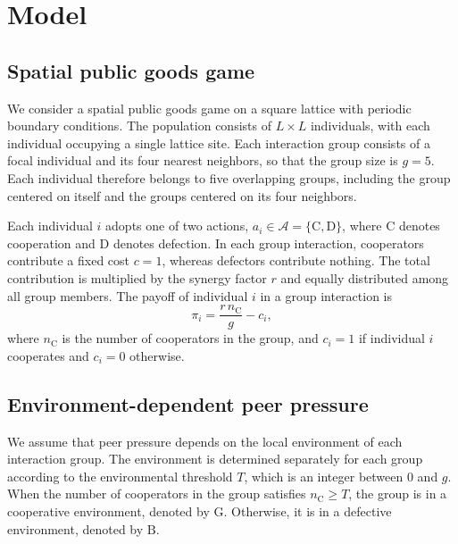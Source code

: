 \documentclass[%
  aip,cha,
  amsmath,amssymb,
  reprint,
  floatfix,
  article-title,
]{revtex4-2}
\begin{document}
\section{Model}\label{sec:model}

\subsection{Spatial public goods game}\label{sec:pgg}

We consider a spatial public goods game on a square lattice with periodic boundary conditions. The population consists of $L\times L$ individuals, with each individual occupying a single lattice site. Each interaction group consists of a focal individual and its four nearest neighbors, so that the group size is $g=5$. Each individual therefore belongs to five overlapping groups, including the group centered on itself and the groups centered on its four neighbors.

Each individual $i$ adopts one of two actions, $a_i\in\mathcal{A}=\{\mathrm{C},\mathrm{D}\}$, where $\mathrm{C}$ denotes cooperation and $\mathrm{D}$ denotes defection. In each group interaction, cooperators contribute a fixed cost $c=1$, whereas defectors contribute nothing. The total contribution is multiplied by the synergy factor $r$ and equally distributed among all group members. The payoff of individual $i$ in a group interaction is
\begin{equation}
\pi_i=\frac{r\,n_{\mathrm{C}}}{g}-c_i,
\label{eq:payoff}
\end{equation}
where $n_{\mathrm{C}}$ is the number of cooperators in the group, and $c_i=1$ if individual $i$ cooperates and $c_i=0$ otherwise.

\subsection{Environment-dependent peer pressure}\label{sec:pressure}

We assume that peer pressure depends on the local environment of each interaction group. The environment is determined separately for each group according to the environmental threshold $T$, which is an integer between $0$ and $g$. When the number of cooperators in the group satisfies $n_{\mathrm{C}}\geq T$, the group is in a cooperative environment, denoted by $\mathrm{G}$. Otherwise, it is in a defective environment, denoted by $\mathrm{B}$.
\end{document}
